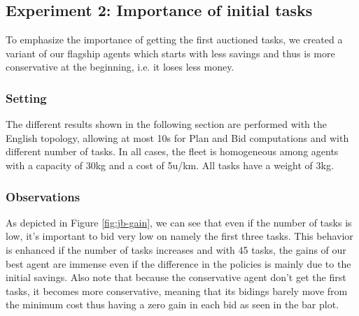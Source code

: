 \documentclass[11pt]{article}
\begin{document}
\subsection{Experiment 2: Importance of initial tasks}
To emphasize the importance of getting the first auctioned tasks, we created a variant of our flagship agents which starts with less savings and thus is more conservative at the beginning, i.e. it loses less money.


\subsubsection{Setting}
The different results shown in the following section are performed with the English topology, allowing at most 10s for Plan and Bid computations and with different number of tasks. In all cases, the fleet is homogeneous among agents with a capacity of 30kg and a cost of 5u/km. All tasks have a weight of 3kg. 

\subsubsection{Observations}

 As depicted in Figure \ref{fig:jb-gain}, we can see that even if the number of tasks is low, it's important to bid very low on namely the first three tasks. This behavior is enhanced if the number of tasks increases and with 45 tasks, the gains of our best agent are immense even if the difference in the policies is mainly due to the initial savings. Also note that because the conservative agent don't get the first tasks, it becomes more conservative, meaning that its bidings barely move from the minimum cost thus having a zero gain in each bid as seen in the bar plot. 
\end{document}
